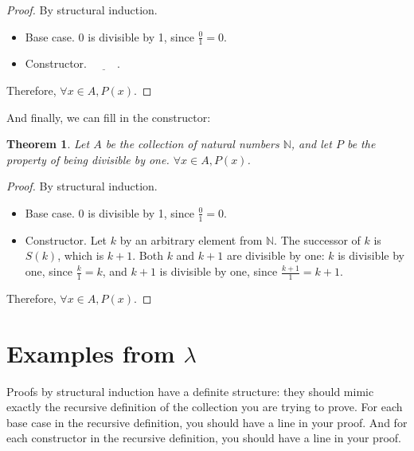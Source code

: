 \documentclass{book}
\numberwithin{equation}{chapter}
\newcommand{\blank}{\underline{\hspace{1cm}}}
\newtheorem*{anon-theorem}{Theorem}
\begin{document}
\begin{proof}
By structural induction.

\begin{itemize}
\item{Base case. 0 is divisible by 1, since $\frac{0}{1} = 0$.}
\item{Constructor. $\blank$.}
\end{itemize}

\noindent
Therefore, $\forall x \in A, P(x)$.
\end{proof}

\noindent
\hrulefill
\newline

\noindent
And finally, we can fill in the constructor:

\noindent
\hrulefill

\begin{anon-theorem}
Let $A$ be the collection of natural numbers $\mathbb{N}$, and let $P$ be the property of being divisible by one. $\forall x \in A, P(x)$.
\end{anon-theorem}

\begin{proof}
By structural induction.

\begin{itemize}
\item{Base case. 0 is divisible by 1, since $\frac{0}{1} = 0$.}
\item{Constructor. Let $k$ by an arbitrary element from $\mathbb{N}$. The successor of $k$ is $S(k)$, which is $k  + 1$. Both $k$ and $k + 1$ are divisible by one: $k$ is divisible by one, since $\frac{k}{1} = k$, and $k + 1$ is divisible by one, since $\frac{k + 1}{1} = k + 1$.}
\end{itemize}

\noindent
Therefore, $\forall x \in A, P(x)$.
\end{proof}

\noindent
\hrulefill
\newline


\section{Examples from $\lambda$}

Proofs by structural induction have a definite structure: they should mimic exactly the recursive definition of the collection you are trying to prove. For each base case in the recursive definition, you should have a line in your proof. And for each constructor in the recursive definition, you should have a line in your proof.
\end{document}
